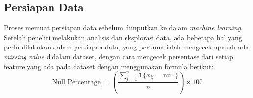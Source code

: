 \subsection{Persiapan Data}
Proses memuat persiapan data sebelum diinputkan ke dalam \textit{machine learning}. Setelah peneliti melakukan analisis dan eksplorasi data, ada beberapa hal yang perlu dilakukan dalam persiapan data, yang pertama ialah mengecek apakah ada \textit{missing value} didalam dataset, dengan cara mengecek persentase dari setiap feature yang ada pada dataset dengan menggunakan formula berikut:\\

\begin{equation}
       \text{Null\_Percentage}_i = \left( \frac{\sum_{j=1}^{n} \mathbf{1} \{ x_{ij} = \text{null} \}}{n} \right) \times 100
\label{eq:3.missingvalue}
\end{equation}

